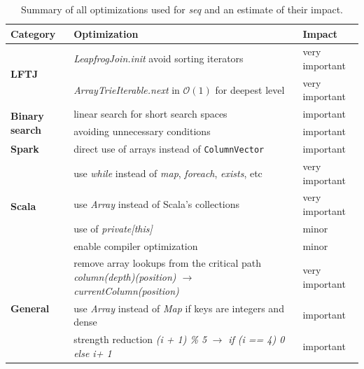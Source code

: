 \begin{table}[]
\begin{tabular}{@{}lp{12cm}l@{}}
\toprule
Category                       & Optimization                                                                           & Impact         \\ \midrule
\multirow{2}{*}{\textbf{LFTJ}} & \textit{LeapfrogJoin.init} avoid sorting iterators                                               & very important \\
& \textit{ArrayTrieIterable.next} in $\mathcal{O} (1)$ for deepest level                               & very important \\
\hline
\multirow{2}{*}{\textbf{Binary search}} & linear search for short search spaces                                                  & important      \\
& avoiding unnecessary conditions                                                        & important      \\
\hline
\textbf{Spark}                  & direct use of arrays instead of \texttt{ColumnVector}                                           &
important

\\
\hline
\multirow{4}{*}{\textbf{Scala}}         & use \textit{while} instead of \textit{map}, \textit{foreach}, \textit{exists}, etc     & very important \\
& use \textit{Array} instead of Scala's collections                                      & very important \\
& use of \textit{private{[}this{]}}                                                      & minor          \\
& enable compiler optimization                                                           & minor          \\
\hline
\multirow{3}{*}{\textbf{General}}& remove array lookups from the critical path \textit{column(depth)(position) $\rightarrow$ currentColumn(position)} & very important \\
& use \textit{Array} instead of \textit{Map} if keys are integers and dense              & important      \\

& strength reduction \textit{(i + 1) \% 5} $\rightarrow$ \textit{if (i == 4) 0 else i+ 1}         & important      \\ \bottomrule

\end{tabular}
\caption{Summary of all optimizations used for \textit{seq} and an estimate of their impact. }
\label{table:optimizations-seq}
\end{table}

